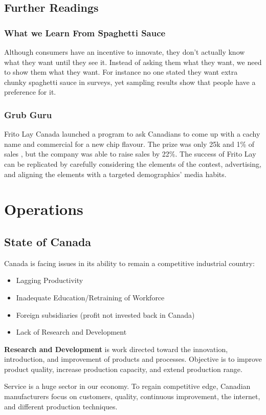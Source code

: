 \documentclass[english, 12pt]{article}
\begin{document}
\subsection*{Further Readings}
\subsubsection*{What we Learn From Spaghetti Sauce}
Although consumers have an incentive to innovate, they don't actually know what they want until they see it. Instead of asking them what they want, we need to show them what they want. For instance no one stated they want extra chunky spaghetti sauce in surveys, yet sampling results show that people have a preference for it.
\subsubsection*{Grub Guru}
Frito Lay Canada launched a program to ask Canadians to come up with a cachy name and commercial for a new chip flavour. The prize was only 25k and 1\% of sales , but the company was able to raise sales by 22\%. The success of Frito Lay can be replicated by carefully considering the elements of the contest, advertising, and aligning the elements with a targeted demographics' media habits.
\section{Operations}
\subsection{State of Canada}
Canada is facing issues in its ability to remain a competitive industrial country:
\begin{itemize}
\item Lagging Productivity
\item Inadequate Education/Retraining of Workforce
\item Foreign subsidiaries (profit not invested back in Canada)
\item Lack of Research and Development
\end{itemize}
\begin{defn}[R\&D]
\textbf{Research and Development} is work directed toward the innovation, introduction, and improvement of products and processes. Objective is to improve product quality, increase production capacity, and extend production range.
\end{defn}
\begin{note}
Service is a huge sector in our economy. To regain competitive edge, Canadian manufacturers focus on customers, quality, continuous improvement, the internet, and different production techniques. 
\end{note}
\end{document}

